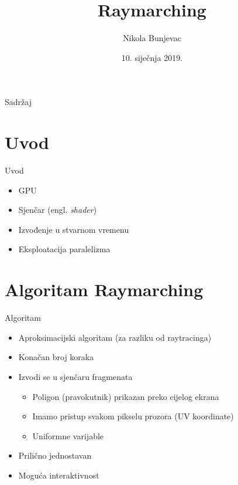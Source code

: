 \documentclass[12pt]{beamer}
\title{Raymarching}
\date{10. siječnja 2019.}
\author{Nikola Bunjevac}
\institute{Fakultet elektrotehnike i računarstva}
\begin{document}
  \maketitle

  \begin{frame}{Sadržaj}
    \tableofcontents
  \end{frame}

  \section{Uvod}

  \begin{frame}{Uvod}
    \begin{itemize}
    \item GPU
    \item Sjenčar (engl. {\sl shader}\/)
    \item Izvođenje u stvarnom vremenu
    \item Eksploatacija paralelizma
    \end{itemize}
  \end{frame}

  \section{Algoritam Raymarching}

  \begin{frame}{Algoritam}
    \begin{itemize}
    \item Aproksimacijski algoritam (za razliku od raytracinga)
    \item Konačan broj koraka
    \item Izvodi se u sjenčaru fragmenata
      \begin{itemize}
      \item Poligon (pravokutnik) prikazan preko cijelog ekrana
      \item Imamo pristup svakom pikselu prozora (UV koordinate)
      \item Uniformne varijable
      \end{itemize}
    \item Prilično jednostavan
    \item Moguća interaktivnost
    \end{itemize}
  \end{frame}
\end{document}
